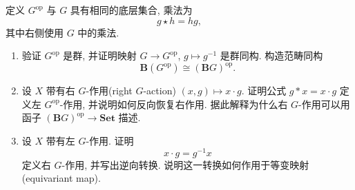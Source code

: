 \documentclass{article}
\begin{document}
\begin{problem}
  定义 $G^{\mathrm{op}}$ 与 $G$ 具有相同的底层集合, 乘法为
  \[
    g\star h=hg,
  \]
  其中右侧使用 $G$ 中的乘法.
  \begin{enumerate}
    \item[(a)] 验证 $G^{\mathrm{op}}$ 是群, 并证明映射 $G\to G^{\mathrm{op}}$, $g\mapsto g^{-1}$ 是群同构. 构造范畴同构
      \[
        \mathbf{B}(G^{\mathrm{op}})\cong(\mathbf{B}G)^{\mathrm{op}}.
      \]
    \item[(b)] 设 $X$ 带有右 $G$-作用(right $G$-action) $(x,g)\mapsto x\cdot g$. 证明公式 $g*x=x\cdot g$ 定义左 $G^{\mathrm{op}}$-作用, 并说明如何反向恢复右作用. 据此解释为什么右 $G$-作用可以用函子 $(\mathbf{B}G)^{\mathrm{op}}\to\mathbf{Set}$ 描述.
    \item[(c)] 设 $X$ 带有左 $G$-作用. 证明
      \[
        x\cdot g=g^{-1}x
      \]
      定义右 $G$-作用, 并写出逆向转换. 说明这一转换如何作用于等变映射(equivariant map).
  \end{enumerate}
\end{problem}
\end{document}
